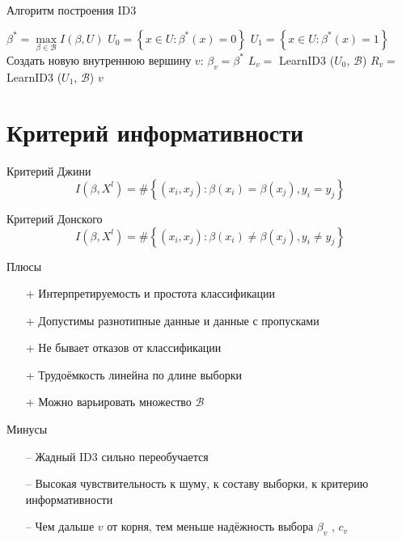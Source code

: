 \documentclass[10pt]{beamer}
\begin{document}
{
\begin{frame}{Алгоритм построения ID3}
  \begin{algorithmic}[1]
         \State {}
       \EndIf
       \State $\beta^* = \max\limits_{\beta \in \mathcal{B}} I(\beta, U)$
       \State $U_0 = \left\{ x \in U : \beta^*(x) = 0\right\}$	
       \State $U_1 = \left\{ x \in U : \beta^*(x) = 1\right\}$	
         \State {}
       \EndIf
       \State Создать новую внутреннюю вершину $v$: $\beta_v = \beta^*$
       \State $L_v =$ LearnID3 ($U_0$, $\mathcal{B}$)
       \State $R_v =$ LearnID3 ($U_1$, $\mathcal{B}$)
       \State \Return $v$
    \EndFunction
  \end{algorithmic}    
\end{frame}
}

\section{Критерий информативности}

\begin{frame}{Критерий Джини}
  $$I(\beta,X^l)= \# \left\{ (x_i, x_j): \beta(x_i) = \beta(x_j), y_i = y_j \right\}$$
\end{frame}

\begin{frame}{Критерий Донского}
  $$I(\beta,X^l)= \# \left\{ (x_i, x_j): \beta(x_i) \neq \beta(x_j), y_i \neq y_j \right\}$$
\end{frame}

\begin{frame}{Плюсы}
	\begin{enumerate}[<+- |alert@+>] 
	\item[+] Интерпретируемость и простота классификации
	\item[+] Допустимы разнотипные данные и данные с пропусками
	\item[+] Не бывает отказов от классификации
	\item[+] Трудоёмкость линейна по длине выборки
	\item[+] Можно варьировать множество $\mathcal{B}$
	\end{enumerate}
\end{frame}

\begin{frame}{Минусы}
	\begin{enumerate} [<+- |alert@+>] 
	\item[--] Жадный ID3 сильно переобучается
	\item[--] Высокая чувствительность к шуму, к составу выборки, к критерию информативности
	\item[--] Чем дальше $v$ от корня, тем меньше надёжность выбора $\beta_v$ , $c_v$
	\end{enumerate}
\end{frame}
\end{document}
